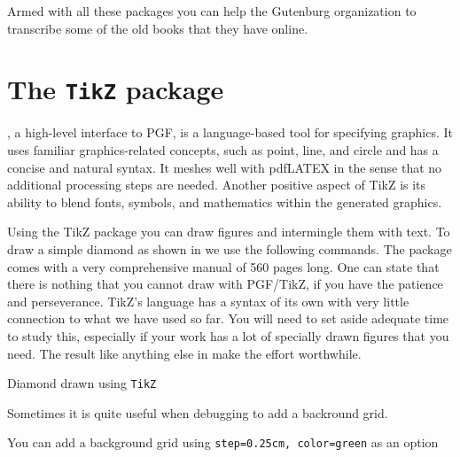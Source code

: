 Armed with all these packages you can help the Gutenburg organization to transcribe
some of the old books that they have online. 

\clearpage

\section{The \protect\texttt{TikZ} package}
, a high-level interface to PGF, is a language-based tool for specifying graphics.
It uses familiar graphics-related concepts, such as point, line, and circle and
has a concise and natural syntax. It meshes well with pdfLATEX in the sense that
no additional processing steps are needed. Another positive aspect of TikZ is
its ability to blend \tex fonts, symbols, and mathematics within the generated
graphics.


Using the TikZ package you can draw figures and intermingle them with text. To draw a simple diamond as shown in  we use
the following commands. The package comes with a very comprehensive manual of 560 pages long. One can state that there is nothing that you cannot draw with PGF/TikZ, if you have the patience and perseverance. TikZ's language has a syntax of its own with very little connection to what we have used so far. You will need to set aside adequate time to study this, especially if your work has a lot of specially drawn figures that you need. The result like anything else in \tex make the effort worthwhile.

\begin{marginfigure}
\begin{center}
\end{center}
\caption{Diamond drawn using \protect\texttt{TikZ}}
\label{fig:diamond}
\end{marginfigure}


\begin{teXXX}
\end{teXXX}



Sometimes it is quite useful when debugging to add a backround grid. 

\begin{marginfigure}
\begin{centering}
\caption{You can add a background grid using \texttt{step=0.25cm, color=green} as an option}
\end{centering}
\end{marginfigure}

